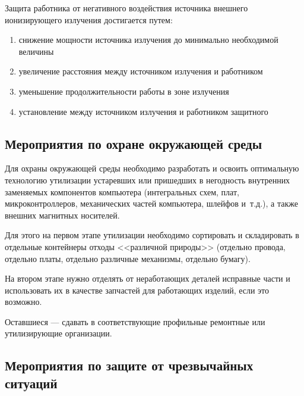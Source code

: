 Защита работника от негативного воздействия источника внешнего ионизирующего излучения достигается путем:

\begin{enumerate}
	\item снижение мощности источника излучения до минимально необходимой величины 
	\item увеличение расстояния между источником излучения и работником 
	\item уменьшение продолжительности работы в зоне излучения 
	\item установление между источником излучения и работником защитного
\end{enumerate}


\subsection{Мероприятия по охране окружающей среды}

Для охраны окружающей среды необходимо разработать и освоить оптимальную технологию утилизации устаревших или пришедших в негодность внутренних заменяемых компонентов компьютера (интегральных схем, плат, микроконтроллеров, механических частей компьютера, шлейфов и~т.д.), а также внешних магнитных носителей.

Для этого на первом этапе утилизации необходимо сортировать и складировать в отдельные контейнеры отходы <<различной природы>> (отдельно провода, отдельно платы, отдельно различные механизмы, отдельно бумагу).

На втором этапе нужно отделять от неработающих деталей исправные части и использовать их в качестве запчастей для работающих изделий, если это возможно.

Оставшиеся --- сдавать в соответствующие профильные ремонтные или утилизирующие организации.

\subsection{Мероприятия по защите от чрезвычайных ситуаций}

